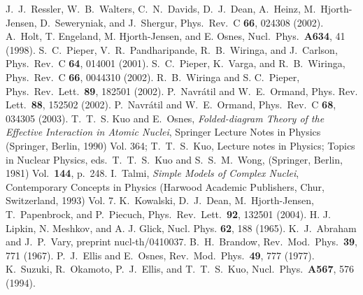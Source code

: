\documentclass[prc,aps,amsmath,amssymb,preprintnumbers,showpacs,twocolumn]{revtex4}
\begin{document}
\begin{thebibliography}{99}
 J.~J.~Ressler, W.~B.~Walters, C.~N.~Davids, D.~J.~Dean, A.~Heinz, 
M.~Hjorth-Jensen, D.~Seweryniak, and J.~Shergur,
Phys.~Rev.~C {\bf 66}, 024308 (2002). 
 A.\ Holt, T. Engeland, M. Hjorth-Jensen, and E. Osnes,
    Nucl.~Phys.~{\bf A634}, 41 (1998).
 S.~C.~Pieper, V.~R.~Pandharipande, R.~B.~Wiringa, and 
J.~Carlson, Phys.~Rev.~C {\bf 64}, 014001 (2001). 
 S.~C.~Pieper, K.~Varga, and R.~B.~Wiringa, Phys.~Rev.~C 
{\bf 66}, 0044310 (2002). 
  R.~B.~Wiringa and S. C.~Pieper, Phys.~Rev.~Lett.~{\bf 89},
182501 (2002).
 P.~Navr\'atil and W.~E.~Ormand, 
Phys. Rev. Lett.~{\bf 88}, 152502 (2002). 
 P.~Navr\'atil and W.~E.~Ormand, 
Phys.~Rev.~C {\bf 68}, 034305 (2003). 
 T.~T.~S. Kuo and E.~Osnes, {\it Folded-diagram Theory 
of the Effective Interaction in  Atomic Nuclei}, Springer Lecture Notes 
in Physics (Springer, Berlin, 1990) Vol. 364;
T.~T.~S.\ Kuo, Lecture notes in
Physics; Topics in Nuclear Physics, eds.\ T.~T.~S.\ Kuo and S.~S.~M.\
Wong, (Springer, Berlin, 1981) Vol.\ {\bf 144}, p.\ 248.
 I.~Talmi, {\em Simple Models of Complex Nuclei},
Contemporary Concepts in Physics (Harwood Academic Publishers, 
Chur, Switzerland, 1993) Vol. 7.   %
 K.~Kowalski, D.~J.~Dean, M.~Hjorth-Jensen, T.~Papenbrock,
and P.~Piecuch, Phys.~Rev.~Lett.~{\bf 92}, 132501 (2004).
 H. J. Lipkin, N. Meshkov, and A. J. Glick, 
Nucl. Phys. {\bf 62}, 188 (1965).
 K.~J.~Abraham and J.~P.~Vary, preprint nucl-th/0410037.
\bibitem{bran} B.~H.~Brandow, Rev.~Mod.~Phys.~{\bf39}, 771 (1967).
\bibitem{usrev} P.~J.~Ellis and E.~Osnes, Rev.~Mod.~Phys.~{\bf49}, 777 (1977).
\bibitem{suz} K.~Suzuki, R.~Okamoto, P.~J.~Ellis, and T.~T.~S.~Kuo,
Nucl.~Phys.~{\bf A567}, 576 (1994).
\end{thebibliography}
\end{document}
